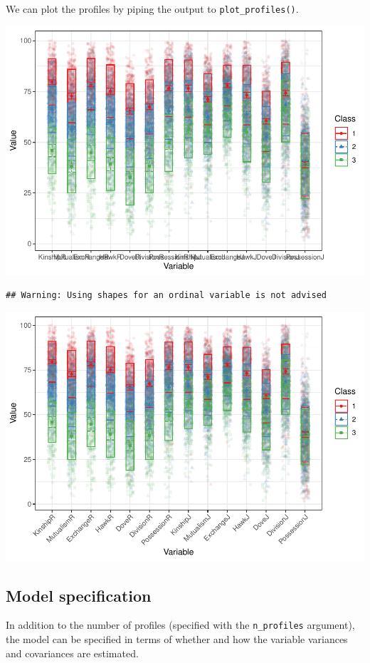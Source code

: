 \documentclass[man]{apa6}
\begin{document}
We can plot the profiles by piping the output to \texttt{plot\_profiles()}.

\includegraphics{paper_files/figure-latex/curry_mac_p3-1.pdf}

\begin{verbatim}
## Warning: Using shapes for an ordinal variable is not advised
\end{verbatim}

\includegraphics{paper_files/figure-latex/curry_mac_p3-2.pdf}

\hypertarget{model-specification}{%
\subsection{Model specification}\label{model-specification}}

In addition to the number of profiles (specified with the \texttt{n\_profiles}
argument), the model can be specified in terms of whether and how the variable
variances and covariances are estimated.
\end{document}
